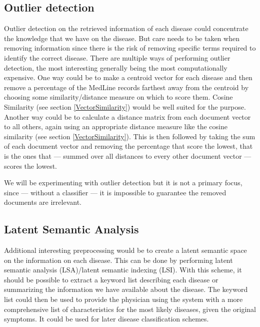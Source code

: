 \subsection{Outlier detection}

Outlier detection on the retrieved information of each disease could
concentrate the knowledge that we have on the disease. But care needs
to be taken when removing information since there is the risk of
removing specific terms required to identify the correct
disease. There are multiple ways of performing outlier detection, the
most interesting generally being the most computationally
expensive. One way could be to make a centroid vector for each disease
and then remove a percentage of the MedLine records farthest away from
the centroid by choosing some similarity/distance measure on which to
score them. Cosine Similarity (see section \ref{VectorSimilarity})
would be well suited for the purpose. Another way could be to
calculate a distance matrix from each document vector to all others,
again using an appropriate distance measure like the cosine similarity
(see section \ref{VectorSimilarity}). This is then followed by taking
the sum of each document vector and removing the percentage that score
the lowest, that is the ones that --- summed over all distances to
every other document vector --- scores the lowest. 

  We will be
experimenting with outlier detection but it is not a primary focus,
since --- without a classifier --- it is impossible to guarantee the
removed documents are irrelevant.

\subsection{Latent Semantic Analysis\label{LSA}}

Additional interesting preprocessing would be to create a latent
semantic space on the information on each disease. This can be done by
performing latent semantic analysis (LSA)/latent semantic indexing
(LSI). With this scheme, it should be possible to extract a keyword
list describing each disease or summarizing the information we have
available about the disease. The keyword list could then be used to
provide the physician using the system with a more comprehensive list
of characteristics for the most likely diseases, given the original
symptoms. It could be used for later disease classification schemes.


